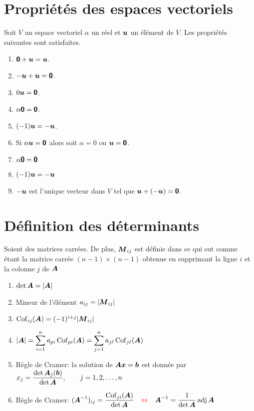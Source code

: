 \begin{adjmulticols}{1}{0in}{-2in}
\section{Propriétés des espaces vectoriels}
Soit $V$ un espace vectoriel $\alpha$ un réel et $\boldsymbol{u}$ un élément de $V$.  
Les propriétés suivantes sont satisfaites.
\begin{enumerate}
\item $\mbox{\textsf{\textbf{{0}}}} + \boldsymbol{u} = \boldsymbol{u}$.
\item $-\boldsymbol{u} + \boldsymbol{u} = \mbox{\textsf{\textbf{{0}}}}$.
\item $0\boldsymbol{u} = \mbox{\textsf{\textbf{{0}}}}$.
\item $\alpha\mbox{\textsf{\textbf{{0}}}} = \mbox{\textsf{\textbf{{0}}}}$.
\item $(-1)\boldsymbol{u} = -\boldsymbol{u}$.
\item Si $\alpha\boldsymbol{u} = \mbox{\textsf{\textbf{{0}}}}$ alors soit $\alpha=0$ ou $\boldsymbol{u}=\mbox{\textsf{\textbf{{0}}}}$.
\item $\alpha\mbox{\textsf{\textbf{{0}}}} = \mbox{\textsf{\textbf{{0}}}}$
\item $(-1)\boldsymbol{u} = -\boldsymbol{u}$
\item $-\boldsymbol{u}$ est l'unique vecteur dans $V$ tel que $\boldsymbol{u} + (-\boldsymbol{u}) = \mbox{\textsf{\textbf{{0}}}}$.
\end{enumerate}


\section{Définition des déterminants}
Soient des matrices carrées.  De plus, $\boldsymbol{M}_{ij}$ est définie dans ce qui sut
comme étant la matrice carrée $(n-1)\times (n-1)$ obtenue en
supprimant la ligne $i$ et la colonne $j$ de $\boldsymbol{A}$
\begin{enumerate}
\item $\det \boldsymbol{A} = |\boldsymbol{A}|$
\item Mineur de l'élément $a_{ij} = |\boldsymbol{M}_{ij}|$
\item $\operatorname{Cof}_{ij}(\boldsymbol{A}) = (-1)^{i+j} |\boldsymbol{M}_{ij}|$
\item $\displaystyle |\boldsymbol{A}| = \sum_{i=1}^n a_{pi} \operatorname{Cof}_{pi}(\boldsymbol{A}) = \sum_{j=1}^n a_{j\ell} \operatorname{Cof}_{j\ell}(\boldsymbol{A})$
\item Règle de Cramer: la solution de $\boldsymbol{A}\boldsymbol{x} = \boldsymbol{b}$ est donnée par 
$\displaystyle x_j = \frac{\det \boldsymbol{A}_j(\boldsymbol{b})}{\det \boldsymbol{A}}, \qquad j=1, 2, \ldots, n$
\item Règle de Cramer: $\displaystyle (\boldsymbol{A}^{-1})_{ij} = \frac{\operatorname{Cof}_{ji}(\boldsymbol{A})}{\det\boldsymbol{A}} {\quad\color{red}\Leftrightarrow\quad} \boldsymbol{A}^{-1} = \frac{1}{\det\boldsymbol{A}} \operatorname{adj}\boldsymbol{A}$
\end{enumerate}


\end{adjmulticols}
